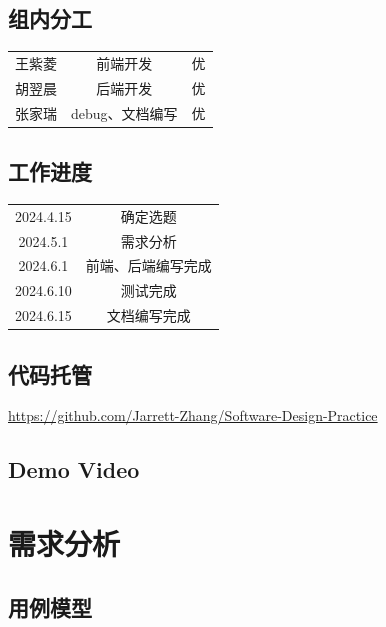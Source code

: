 \documentclass{article}
\begin{document}
\subsection{组内分工}
\begin{center}
\begin{tabular}{c|c|c}
王紫菱 & 前端开发 & 优\\
胡翌晨 & 后端开发 & 优\\
张家瑞 & debug、文档编写 & 优
\end{tabular}
\end{center}

\subsection{工作进度}
\begin{center}
\begin{tabular}{c|c}
2024.4.15 & 确定选题\\
2024.5.1 & 需求分析\\
2024.6.1 & 前端、后端编写完成\\
2024.6.10 & 测试完成\\
2024.6.15 & 文档编写完成
\end{tabular}
\end{center}

\subsection{代码托管}
\href{https://github.com/Jarrett-Zhang/Software-Design-Practice}{https://github.com/Jarrett-Zhang/Software-Design-Practice}

\subsection{Demo Video}

\section{需求分析}

\subsection{用例模型}
\end{document}
